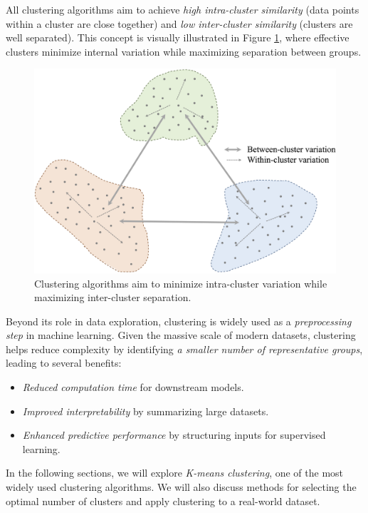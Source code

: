 \documentclass[
  11pt,
]{book}
\providecommand{\tightlist}{%
  \setlength{\itemsep}{0pt}\setlength{\parskip}{0pt}}
\theoremstyle{definition}
\theoremstyle{definition}
\theoremstyle{definition}
\theoremstyle{definition}
\theoremstyle{remark}
\begin{document}
All clustering algorithms aim to achieve \emph{high intra-cluster similarity} (data points within a cluster are close together) and \emph{low inter-cluster similarity} (clusters are well separated). This concept is visually illustrated in Figure \ref{fig:cluster-1}, where effective clusters minimize internal variation while maximizing separation between groups.

\begin{figure}[H]

{\centering \includegraphics[width=0.75\linewidth]{images/ch13_cluster_1} 

}

\caption{Clustering algorithms aim to minimize intra-cluster variation while maximizing inter-cluster separation.}\label{fig:cluster-1}
\end{figure}

Beyond its role in data exploration, clustering is widely used as a \emph{preprocessing step} in machine learning. Given the massive scale of modern datasets, clustering helps reduce complexity by identifying \emph{a smaller number of representative groups}, leading to several benefits:

\begin{itemize}
\tightlist
\item
  \emph{Reduced computation time} for downstream models.\\
\item
  \emph{Improved interpretability} by summarizing large datasets.\\
\item
  \emph{Enhanced predictive performance} by structuring inputs for supervised learning.
\end{itemize}

In the following sections, we will explore \emph{K-means clustering}, one of the most widely used clustering algorithms. We will also discuss methods for selecting the optimal number of clusters and apply clustering to a real-world dataset.
\end{document}
